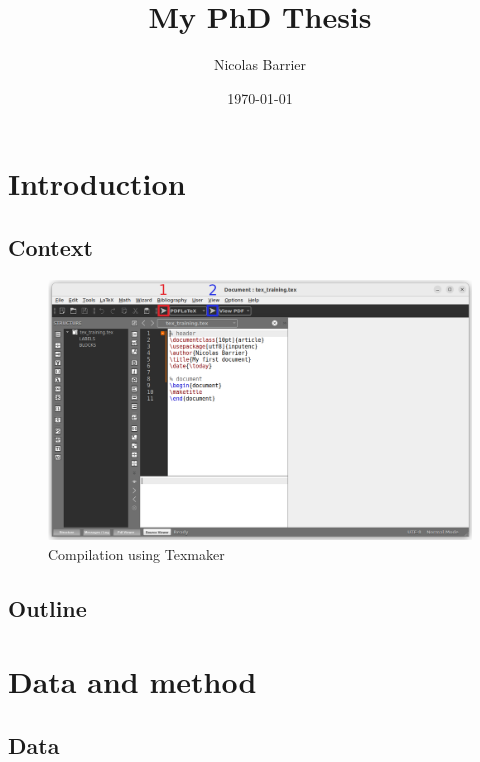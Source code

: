 \documentclass[12pt]{book}
\title{My PhD Thesis}
\author{Nicolas Barrier}
\date{\today}
\begin{document}

\maketitle

\dominitoc

\pagestyle{empty} 
\tableofcontents

\clearpage

\pagestyle{mystyle}

\chapter{Introduction}
\minitoc
\lipsum
\section{Context}
\lipsum

\begin{figure}[h!]
    \centering
    \includegraphics[width=0.5\linewidth]{figs/texmaker-1.png}
    \caption{Compilation using Texmaker}
\end{figure}


\section{Outline}


\chapter{Data and method}
\label{chap:data-method}
\minitoc

\section{Data}
\end{document}

